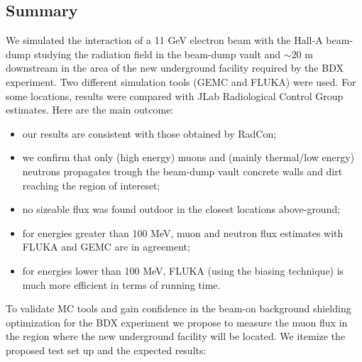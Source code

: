 \subsection{Summary}
We simulated the interaction of a 11 GeV electron beam with the Hall-A beam-dump studying the   radiation field in the beam-dump vault and   $\sim$20 m downstream
 in the area of  the new underground  facility required by the BDX experiment. Two different  simulation tools (GEMC and FLUKA) were used. For some locations, results were compared with JLab Radiological Control Group estimates. 
Here are the main outcome:
\begin{itemize}
\item{our results are consistent with those obtained by RadCon;}
\item{we confirm that only (high energy) muons and (mainly  thermal/low energy) neutrons propagates trough the beam-dump vault concrete walls  and dirt reaching the region of intereset; }
\item{no sizeable flux was found outdoor in the closest locations above-ground;}
\item{for energies greater than 100 MeV, muon and neutron flux estimates with FLUKA and GEMC are in agreement;}
\item{for energies lower than 100 MeV,  FLUKA (using the biasing technique) is much more efficient in terms of running time. }
\end{itemize}
To validate MC tools and gain confidence in the beam-on background shielding optimization  for the  BDX experiment we propose to measure the muon flux in the region where the new underground facility will be located. 
We itemize the proposed test set up and the expected results:
